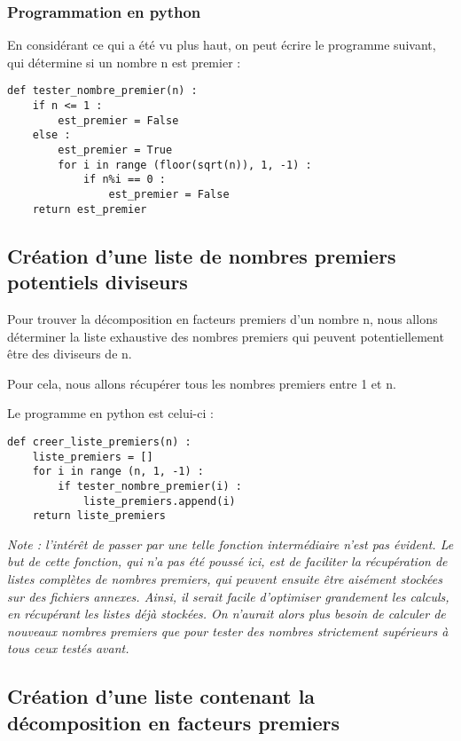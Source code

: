 \subsubsection{Programmation en python}

En considérant ce qui a été vu plus haut, on peut écrire le programme suivant, qui détermine si un nombre n est premier :

\begin{verbatim}
def tester_nombre_premier(n) :
    if n <= 1 :
        est_premier = False
    else :
        est_premier = True
        for i in range (floor(sqrt(n)), 1, -1) :
            if n%i == 0 :
                est_premier = False
    return est_premier
\end{verbatim}

\subsection{Création d'une liste de nombres premiers potentiels diviseurs}

Pour trouver la décomposition en facteurs premiers d'un nombre n, nous allons déterminer la liste exhaustive des nombres premiers qui peuvent potentiellement être des diviseurs de n. 

Pour cela, nous allons récupérer tous les nombres premiers entre 1 et n.

Le programme en python est celui-ci :

\begin{verbatim}
def creer_liste_premiers(n) :
    liste_premiers = []
    for i in range (n, 1, -1) :
        if tester_nombre_premier(i) :
            liste_premiers.append(i)
    return liste_premiers
\end{verbatim}

\textit{\emph{Note :} l'intérêt de passer par une telle fonction intermédiaire n'est pas évident. Le but de cette fonction, qui n'a pas été poussé ici, est de faciliter la récupération de listes complètes de nombres premiers, qui peuvent ensuite être aisément stockées sur des fichiers annexes. Ainsi, il serait facile d'optimiser grandement les calculs, en récupérant les listes déjà stockées. On n'aurait alors plus besoin de calculer de nouveaux nombres premiers que pour tester des nombres strictement supérieurs à tous ceux testés avant.}

\subsection{Création d'une liste contenant la décomposition en facteurs premiers}

